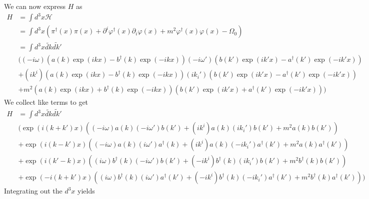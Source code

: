 \documentclass[fontsize=11pt]{scrartcl} %
\numberwithin{equation}{section} %
\numberwithin{figure}{section} %
\numberwithin{table}{section} %
\begin{document}
We can now express $H$ as
\[
    \begin{aligned}
        H &= \int d^3x\mathscr{H}\\
        &=\int d^3x\left( 
        \pi^{\dagger}(x)\pi(x)
        +\partial^{i}\varphi^{\dagger}(x)\partial_{i}\varphi(x)
        +m^2\varphi^{\dagger}(x)\varphi(x) - \Omega_0
        \right)\\
        &=\int d^3x\tilde{dk}\tilde{dk'}\\
            &((-i\omega)\left( 
                a(k)\exp(ikx) - b^{\dagger}(k)\exp(-ikx)
            \right)
            (-i\omega')\left( 
                b(k')\exp(ik'x) - a^{\dagger}(k')\exp(-ik'x)
            \right)\\
            &+(ik^i)\left( 
                a(k)\exp(ikx) - b^{\dagger}(k)\exp(-ikx)
            \right)
            (ik_i')\left( 
                b(k')\exp(ik'x) - a^{\dagger}(k')\exp(-ik'x)
            \right)\\
            &+m^2\left( 
                a(k)\exp(ikx)+b^{\dagger}(k)\exp(-ikx)
            \right)
            \left( 
                b(k')\exp(ik'x) + a^{\dagger}(k')\exp(-ik'x)
            \right)
        )
    \end{aligned}
\]
We collect like terms to get
\[
    \begin{aligned}
        H &=
        \int d^3x\tilde{dk}\tilde{dk'}\\
            &(\exp(i(k+k')x)\left( 
                (-i\omega)a(k)(-i\omega')b(k')
                +(ik^i)a(k)(ik_i')b(k')
                +m^2a(k)b(k')
            \right)\\
            &+\exp(i(k-k')x)\left( 
                (-i\omega)a(k)(i\omega')a^{\dagger}(k)
                +(ik^i)a(k)(-ik_i')a^{\dagger}(k')
                +m^2a(k)a^{\dagger}(k')
            \right)\\
            &+\exp(i(k'-k)x)\left( 
                (i\omega)b^{\dagger}(k)(-i\omega')b(k')
                +(-ik^i)b^{\dagger}(k)(ik_i')b(k')
                +m^2b^{\dagger}(k)b(k')
            \right)\\
            &+\exp(-i(k+k')x)\left( 
                (i\omega)b^{\dagger}(k)(i\omega')a^{\dagger}(k')
                +(-ik^i)b^{\dagger}(k)(-ik_i')a^{\dagger}(k')
                +m^2b^{\dagger}(k)a^{\dagger}(k')
            \right)
        )
    \end{aligned}
\]
Integrating out the $d^3x$ yields
\end{document}

